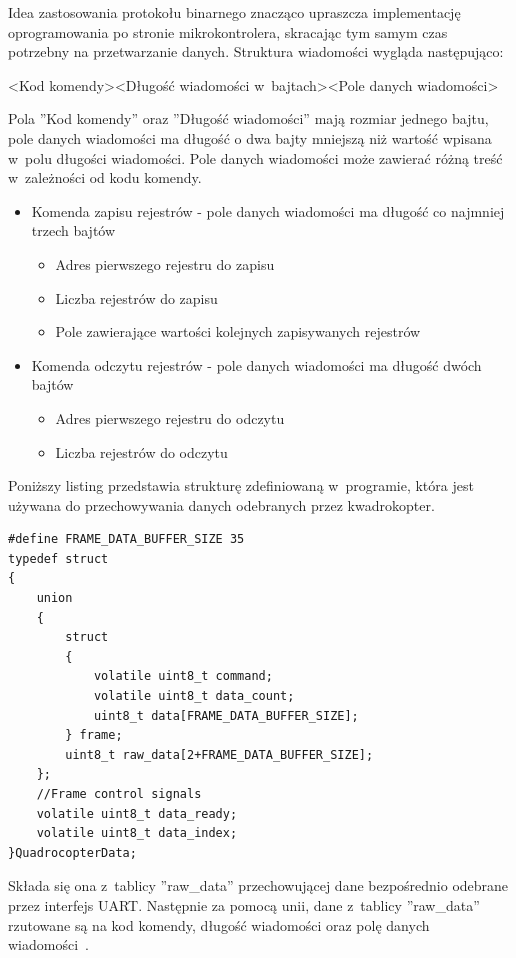 Idea zastosowania protokołu binarnego znacząco upraszcza implementację oprogramowania po stronie mikrokontrolera, skracając tym samym czas potrzebny na przetwarzanie danych. Struktura wiadomości wygląda następująco:

<Kod komendy><Długość wiadomości w~bajtach><Pole danych wiadomości>

Pola ''Kod komendy'' oraz ''Długość wiadomości'' mają rozmiar jednego bajtu, pole danych wiadomości ma długość o dwa bajty mniejszą niż wartość wpisana w~polu długości wiadomości.
Pole danych wiadomości może zawierać różną treść w~zależności od kodu komendy. 
\begin{itemize}
	\item Komenda zapisu rejestrów - pole danych wiadomości ma długość co najmniej trzech bajtów
	\begin{itemize}
		\item Adres pierwszego rejestru do zapisu
		\item Liczba rejestrów do zapisu
		\item Pole zawierające wartości kolejnych zapisywanych rejestrów
	\end{itemize}
	\item Komenda odczytu rejestrów - pole danych wiadomości ma długość dwóch bajtów
	\begin{itemize}
		\item Adres pierwszego rejestru do odczytu
		\item Liczba rejestrów do odczytu
	\end{itemize} 	
\end{itemize} 

Poniższy listing przedstawia strukturę zdefiniowaną w~programie, która jest używana do przechowywania danych odebranych  przez kwadrokopter.

\begin{lstlisting}
#define FRAME_DATA_BUFFER_SIZE 35
typedef struct
{
    union
    {
        struct
        {
            volatile uint8_t command;
            volatile uint8_t data_count;
            uint8_t data[FRAME_DATA_BUFFER_SIZE];
        } frame;
        uint8_t raw_data[2+FRAME_DATA_BUFFER_SIZE];
    };
    //Frame control signals
    volatile uint8_t data_ready;
    volatile uint8_t data_index;
}QuadrocopterData;
\end{lstlisting}

Składa się ona z~tablicy ''raw\_data'' przechowującej dane bezpośrednio odebrane przez interfejs UART. Następnie za pomocą unii, dane z~tablicy ''raw\_data'' rzutowane są na kod komendy, długość wiadomości oraz polę danych wiadomości~\cite{prog1}.

